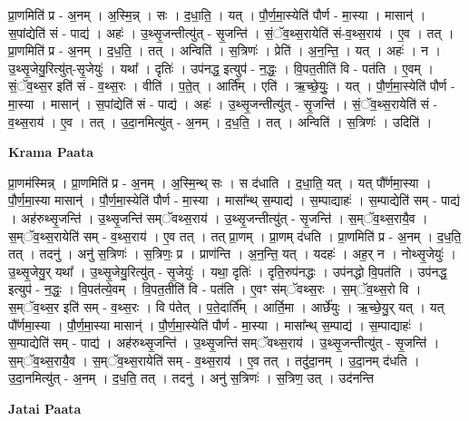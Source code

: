 \documentclass[17pt]{extarticle}
\begin{document}
प्रा॒णमिति॑ प्र - अ॒नम् । अ॒स्मि॒न्न् । सः । द॒धा॒ति॒ । यत् । पौ॒र्ण॒मा॒स्येति॑ पौर्ण - मा॒स्या । मासान्॑ । स॒पांद्येति॑ सं - पाद्य॑ । अहः॑ । उ॒थ्सृ॒जन्तीत्यु॑त् - सृ॒जन्ति॑ । सं॒ॅव॒थ्स॒रायेति॑ सं-व॒थ्स॒राय॑ । ए॒व । तत् । प्रा॒णमिति॑ प्र - अ॒नम् । द॒ध॒ति॒ । तत् । अन्विति॑ । स॒त्रिणः॑ । प्रेति॑ । अ॒न॒न्ति॒ । यत् । अहः॑ । न । उ॒थ्सृ॒जेयु॒रित्यु॑त्-सृ॒जेयुः॑ । यथा᳚ । दृतिः॑ । उप॑नद्ध॒ इत्युप॑ - न॒द्धः॒ । वि॒पत॒तीति॑ वि - पत॑ति । ए॒वम् । सं॒ॅव॒थ्स॒र इति॑ सं - व॒थ्स॒रः । वीति॑ । प॒ते॒त् । आर्ति᳚म् । एति॑ । ऋ॒च्छे॒युः॒ । यत् । पौ॒र्ण॒मा॒स्येति॑ पौर्ण - मा॒स्या । मासान्॑ । स॒पांद्येति॑ सं - पाद्य॑ । अहः॑ । उ॒थ्सृ॒जन्तीत्यु॑त् - सृ॒जन्ति॑ । सं॒ॅव॒थ्स॒रायेति॑ सं - व॒थ्स॒राय॑ । ए॒व । तत् । उ॒दा॒नमित्यु॑त् - अ॒नम् । द॒ध॒ति॒ । तत् । अन्विति॑ । स॒त्रिणः॑ । उदिति॑ ।  \newline


\textbf{Krama Paata} \newline

प्रा॒णम॑स्मिन्न् । प्रा॒णमिति॑ प्र - अ॒नम् । अ॒स्मि॒न्थ् सः । स द॑धाति । द॒धा॒ति॒ यत् । यत् पौ᳚र्णमा॒स्या । पौ॒र्ण॒मा॒स्या मासान्॑ । पौ॒र्ण॒मा॒स्येति॑ पौर्ण - मा॒स्या । मासा᳚न्थ् स॒म्पाद्य॑ । स॒म्पाद्याहः॑ । स॒म्पाद्येति॑ सम् - पाद्य॑ । अह॑रुथ्सृ॒जन्ति॑ । उ॒थ्सृ॒जन्ति॑ सम्ॅवथ्स॒राय॑ । उ॒थ्सृ॒जन्तीत्यु॑त् - सृ॒जन्ति॑ । स॒म्ॅव॒थ्स॒रायै॒व । स॒म्ॅव॒थ्स॒रायेति॑ सम् - व॒थ्स॒राय॑ । ए॒व तत् । तत् प्रा॒णम् । प्रा॒णम् द॑धति । प्रा॒णमिति॑ प्र - अ॒नम् । द॒ध॒ति॒ तत् । तदनु॑ । अनु॑ स॒त्रिणः॑ । स॒त्रिणः॒ प्र । प्राण॑न्ति । अ॒न॒न्ति॒ यत् । यदहः॑ । अह॒र् न । नोथ्सृ॒जेयुः॑ । उ॒थ्सृ॒जेयु॒र् यथा᳚ । उ॒थ्सृ॒जेयु॒रित्यु॑त् - सृ॒जेयुः॑ । यथा॒ दृतिः॑ । दृति॒रुप॑नद्धः । उप॑नद्धो वि॒पत॑ति । उप॑नद्ध॒ इत्युप॑ - न॒द्धः॒ । वि॒पत॑त्ये॒वम् । वि॒पत॒तीति॑ वि - पत॑ति । ए॒वꣳ स॑म्ॅवथ्स॒रः । स॒म्ॅव॒थ्स॒रो वि । स॒म्ॅव॒थ्स॒र इति॑ सम् - व॒थ्स॒रः । वि प॑तेत् । प॒ते॒दार्ति᳚म् । आर्ति॒मा । आर्छे॑युः । ऋ॒च्छे॒यु॒र् यत् । यत् पौ᳚र्णमा॒स्या । पौ॒र्ण॒मा॒स्या मासान्॑ । पौ॒र्ण॒मा॒स्येति॑ पौर्ण - मा॒स्या । मासा᳚न्थ् स॒म्पाद्य॑ । स॒म्पाद्याहः॑ । स॒म्पाद्येति॑ सम् - पाद्य॑ । अह॑रुथ्सृ॒जन्ति॑ । उ॒थ्सृ॒जन्ति॑ सम्ॅवथ्स॒राय॑ । उ॒थ्सृ॒जन्तीत्यु॑त् - सृ॒जन्ति॑ । स॒म्ॅव॒थ्स॒रायै॒व । स॒म्ॅव॒थ्स॒रायेति॑ सम् - व॒थ्स॒राय॑ । ए॒व तत् । तदु॑दा॒नम् । उ॒दा॒नम् द॑धति । उ॒दा॒नमित्यु॑त् - अ॒नम् । द॒ध॒ति॒ तत् । तदनु॑ । अनु॑ स॒त्रिणः॑ । स॒त्रिण॒ उत् । उद॑नन्ति \newline

\textbf{Jatai Paata} \newline
\end{document}
